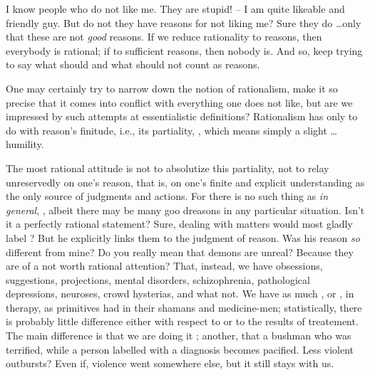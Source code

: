 I know people who do not like me.  They are stupid! -- I am quite
likeable and friendly guy.  But do not they have reasons for not
liking me?  Sure they do \ldots only that these are not {\em good}
reasons.  If we reduce rationality to reasons, then everybody is
rational; if to sufficient reasons, then nobody is. And so, 
 keep trying to say what should and what should not 
count as  reasons. 

One may certainly try to narrow down the notion of rationalism, make 
it so precise that
it comes into conflict with everything one does not like, but are we
impressed by such attempts at essentialistic definitions?  Rationalism
has only to do with reason's finitude, i.e., its partiality,
, which means simply a slight \ldots humility.

The most rational attitude is not to absolutize this
partiality, not to relay unreservedly on one's reason, that is, on
one's finite and explicit understanding as the only source of
judgments and actions. 
For there is no such thing as  {\em in general}, 
, albeit there may be many goo dreasons in any 
particular situation. 
 Isn't it a perfectly
rational statement?  Sure, dealing with matters 
would most gladly label ? But he explicitly links them 
to the judgment of reason. Was his reason {\em so} different from mine? 
Do you really mean that
demons are unreal?  Because they are  of a
 not worth rational attention?  That, instead, we 
have obsessions, suggestions,
projections, mental disorders, schizophrenia, pathological
depressions, neuroses, crowd hysterias, and what not.  We have as much
, or , in therapy, as primitives had in
their shamans and medicine-men; statistically, there is probably
little difference either with respect to  or to the
results of treatement.  The main difference is that we are doing it
; another, that a bushman who  was
terrified, while a person labelled with a diagnosis becomes pacified. 
Less violent outbursts? Even if, violence went somewhere else, but it 
still stays with us. 

